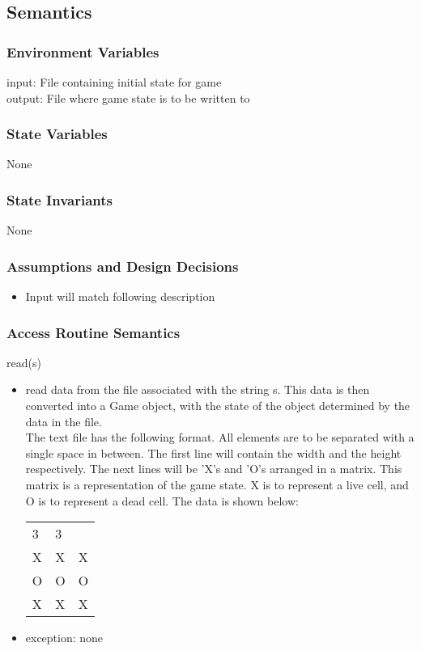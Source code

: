 \documentclass[]{article}
\begin{document}
\subsection*{Semantics}
\subsubsection*{Environment Variables}
input: File containing initial state for game \\
output: File where game state is to be written to

\subsubsection*{State Variables}
None

\subsubsection*{State Invariants}
None

\subsubsection*{Assumptions and Design Decisions}
\begin{itemize}
\item Input will match following description
\end{itemize}

\subsubsection*{Access Routine Semantics}
read(s)
\begin{itemize}
\item read data from the file associated with the string s. This data is then converted into a Game object, with the state of the object determined by the data in the file. \\

The text file has the following format. All elements are to be separated with a single space in between. The first line will contain the width and the height respectively. The next lines will be 'X's and 'O's arranged in a matrix. This matrix is a representation of the game state. X is to represent a live cell, and O is to represent a dead cell. The data is shown below: 
\begin{table}[h]
\hskip5.0cm\begin{tabular}{lll}
3 & 3 &   \\
X & X & X \\
O & O & O \\
X & X & X
\end{tabular}
\end{table}
\item exception: none
\end{itemize}
\end{document}

